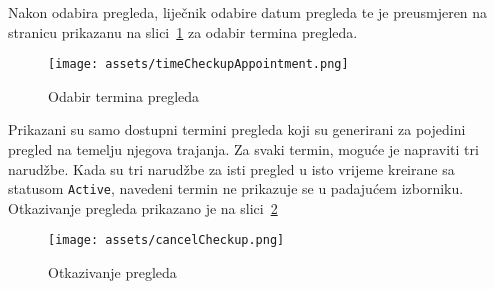 Nakon odabira pregleda, liječnik odabire datum pregleda te je preusmjeren na stranicu prikazanu na slici~\ref{fig:timeCheckupAppointment} za odabir termina pregleda.

\begin{figure}[H]
	\texttt{[image: assets/timeCheckupAppointment.png]}
	\centering
	\caption{Odabir termina pregleda}
	\label{fig:timeCheckupAppointment}
\end{figure}

Prikazani su samo dostupni termini pregleda koji su generirani za pojedini pregled na temelju njegova trajanja. Za svaki termin, moguće je napraviti tri narudžbe. Kada su tri narudžbe za isti pregled u isto vrijeme kreirane sa statusom \texttt{Active}, navedeni termin ne prikazuje se u padajućem izborniku. Otkazivanje pregleda prikazano je na slici~\ref{fig:cancelCheckup}

\begin{figure}[H]
	\texttt{[image: assets/cancelCheckup.png]}
	\centering
	\caption{Otkazivanje pregleda}
	\label{fig:cancelCheckup}
\end{figure}